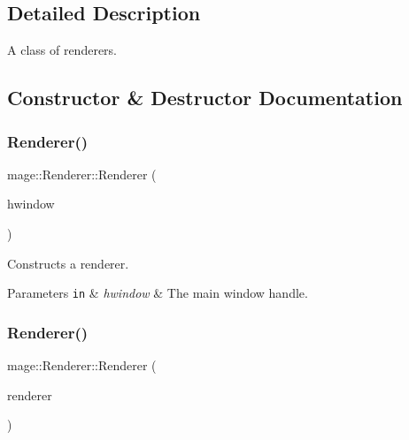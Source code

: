 \subsection{Detailed Description}
A class of renderers. 

\subsection{Constructor \& Destructor Documentation}
\hypertarget{classmage_1_1_renderer_a762dcda433c319af237d1dfd9bc6095f}{}\label{classmage_1_1_renderer_a762dcda433c319af237d1dfd9bc6095f} 
\subsubsection{\texorpdfstring{Renderer()}{Renderer()}\hspace{0.1cm}{\footnotesize\ttfamily [1/3]}}
{\footnotesize\ttfamily mage\+::\+Renderer\+::\+Renderer (\begin{DoxyParamCaption}\item[{H\+W\+ND}]{hwindow }\end{DoxyParamCaption})\hspace{0.3cm}{\ttfamily [explicit]}}

Constructs a renderer.


\begin{DoxyParams}[1]{Parameters}
\mbox{\tt in}  & {\em hwindow} & The main window handle. \\
\hline
\end{DoxyParams}
\hypertarget{classmage_1_1_renderer_acd6b509da2bd7e7d764b45b912fe5298}{}\label{classmage_1_1_renderer_acd6b509da2bd7e7d764b45b912fe5298} 
\subsubsection{\texorpdfstring{Renderer()}{Renderer()}\hspace{0.1cm}{\footnotesize\ttfamily [2/3]}}
{\footnotesize\ttfamily mage\+::\+Renderer\+::\+Renderer (\begin{DoxyParamCaption}\item[{const \hyperlink{classmage_1_1_renderer}{Renderer} \&}]{renderer }\end{DoxyParamCaption})\hspace{0.3cm}{\ttfamily [delete]}}

